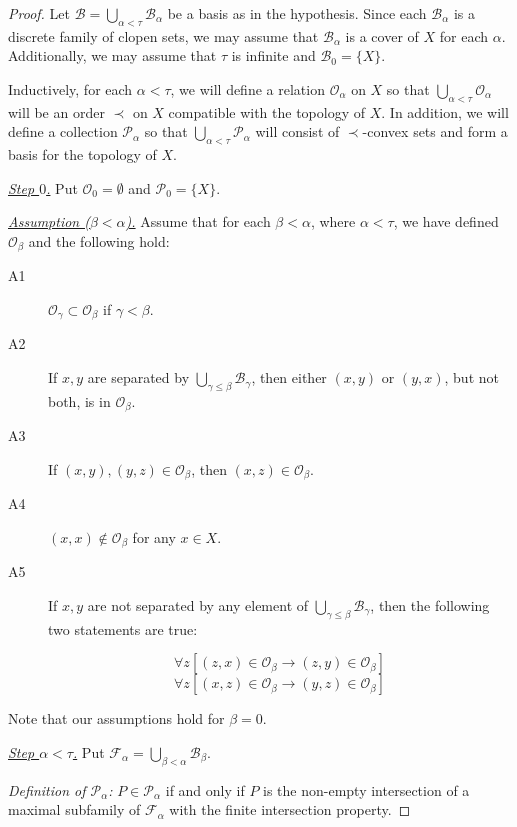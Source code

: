 \documentclass[12pt]{amsart}
\begin{document}
\begin{proof}
Let $\mathcal B = \bigcup_{\alpha<\tau} \mathcal B_\alpha$  be a basis as in the hypothesis. Since each $\mathcal B_\alpha$ is a discrete family of clopen sets, we may assume that $\mathcal B_\alpha$ is a cover of $X$ for each $\alpha$.  Additionally, we may assume that $\tau$ is infinite and $\mathcal B_0=\{X\}$.

Inductively, for each $\alpha<\tau$, we will define a relation $\mathcal O_\alpha$ on $X$ so that $\bigcup_{\alpha<\tau}\mathcal O_\alpha$ will be an order $\prec$ on $X$ compatible with the topology of $X$. In addition, we will define a collection $\mathcal P_\alpha$ so that  $\bigcup_{\alpha<\tau}\mathcal P_\alpha$ will consist of $\prec$-convex sets and form  a basis for the topology of $X$. 

\par\bigskip\noindent
\underline{\it Step $0$.} Put $\mathcal O_0 = \emptyset$ and $\mathcal P_0=\{X\}$.
 

\par\bigskip\noindent
\underline{\it Assumption ($\beta<\alpha$).} Assume that for each $\beta <\alpha$, where $\alpha <\tau$, we have defined $\mathcal O_\beta$ and the following hold:
\begin{description}
	\item[{\rm A1}] $\mathcal O_\gamma\subset \mathcal O_\beta$ if $\gamma<\beta$.
	\item[{\rm A2}] If $x,y$ are separated by $\bigcup_{\gamma\leq \beta} \mathcal B_\gamma$, then either $(x,y)$ or $(y,x)$, but not both,  is in $\mathcal O_\beta$.
	\item[{\rm A3}] If $(x,y),(y,z)\in \mathcal O_\beta$, then $(x,z)\in \mathcal O_\beta$.
	\item[{\rm A4}] $(x,x)\not \in \mathcal O_\beta$ for any $x\in X$.
	\item[{\rm A5}] If $x,y$ are not separated by any element of $\bigcup_{\gamma\leq \beta}\mathcal B_\gamma$, then
the following two statements are true:

$$ \forall z [(z,x)\in \mathcal O_\beta\to(z,y)\in \mathcal O_\beta] $$
$$ \forall z [(x,z)\in \mathcal O_\beta\to(y,z)\in \mathcal O_\beta] $$
\end{description}
Note that our assumptions hold for $\beta=0$.

\par\bigskip\noindent
\underline{\it Step $\alpha<\tau$.} Put $\mathcal F_\alpha =\bigcup_{\beta<\alpha}\mathcal B_\beta$.
\par\medskip\noindent
{\it Definition of $\mathcal P_\alpha$:} $P\in \mathcal P_\alpha$ if and only if $P$ is the non-empty intersection of a maximal subfamily of $\mathcal F_\alpha$ with the finite intersection property.


\end{proof}
\end{document}
